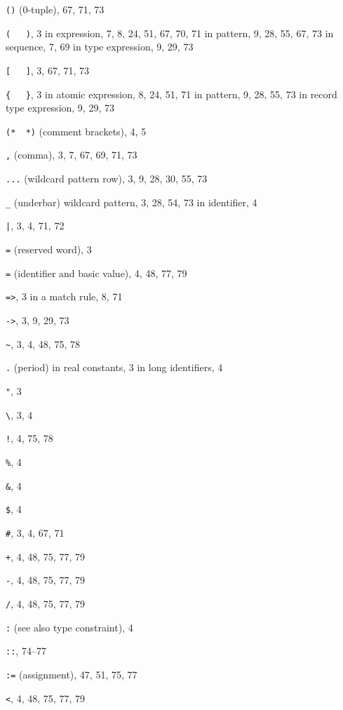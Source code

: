 \label{index-sec}
\begin{theindex}
\item \verb+()+ (0-tuple), 67, 71, 73
\item \verb+(   )+, 3
\subitem in expression, 7, 8, 24, 51, 67, 70, 71
\subitem in pattern, 9, 28, 55, 67, 73
\subitem in sequence, 7, 69
\subitem in type expression, 9, 29, 73
\item \verb+[   ]+, 3, 67, 71, 73
\item \verb+{   }+, 3
\subitem in atomic expression, 8, 24, 51, 71
\subitem in pattern, 9, 28, 55, 73
\subitem in record type expression, 9, 29, 73
\item \verb+(*  *)+ (comment brackets), 4, 5
\item \verb+,+ (comma), 3, 7, 67, 69, 71, 73
\item \verb+...+ (wildcard pattern row), 3, 9, 28, 30, 55, 73
\item \verb+_+ (underbar) 
\subitem wildcard pattern, 3, 28, 54, 73
\subitem in identifier, 4
\item \verb+|+, 3, 4, 71, 72
\item \verb+=+ (reserved word), 3
\item \verb+=+ (identifier and basic value), 4, 48, 77, 79
\item \verb+=>+, 3
\subitem in a match rule, 8, 71
\item \verb+->+, 3, 9, 29, 73
\item \verb+~+, 3, 4, 48, 75, 78
\item \verb+.+ (period) 
\subitem in real constants, 3
\subitem in long identifiers, 4
\item \verb+"+, 3
\item \verb+\+, 3, 4
\item \verb+!+, 4, 75, 78
\item \verb+%+, 4
\item \verb+&+, 4
\item \verb+$+, 4
\item \verb+#+, 3, 4, 67, 71
\item \verb(+(, 4, 48, 75, 77, 79
\item \verb+-+, 4, 48, 75, 77, 79
\item \verb+/+, 4, 48, 75, 77, 79
\item \verb+:+ (see also type constraint), 4
\item \verb+::+, 74--77
\item \verb+:=+ (assignment), 47, 51, 75, 77
\item \verb+<+, 4, 48, 75, 77, 79

\end{theindex}
